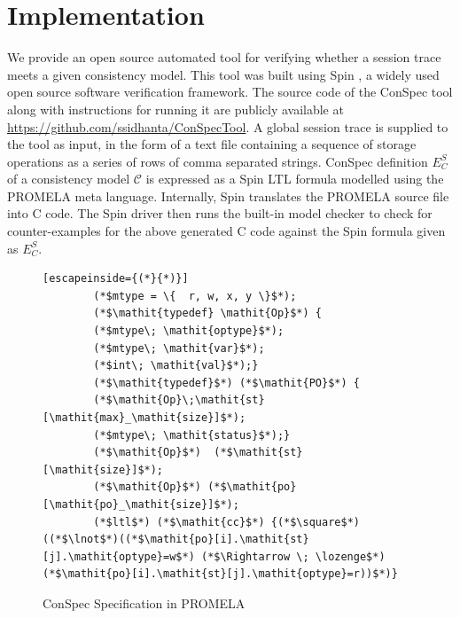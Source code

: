 \documentclass[conference]{IEEEtran}
\begin{document}
	\section{Implementation}\label{sec:impl}
	We provide an open source automated  tool for verifying whether a session trace meets a given consistency model. This tool was built using Spin \cite{Holzmann:2003:SMC:1405716}, a widely used open source software verification framework. The source code of the ConSpec tool along with instructions for running it are publicly available at \url{https://github.com/ssidhanta/ConSpecTool}.  %
	A global session trace is supplied to the tool as input, in the form of a text file containing a sequence of storage operations as a series of rows of comma separated strings.  ConSpec definition $E^S_C$ of a consistency model $\mathcal{C}$ is expressed as a Spin LTL formula modelled using the PROMELA meta language. 
	Internally, Spin translates the PROMELA source file into C code. The Spin driver then runs the built-in model checker to check for counter-examples for the above generated C code  against  the Spin formula given as $E^S_C$. %
	\begin{figure}\caption{ConSpec Specification in PROMELA}\label{format:spec}
		\begin{lstlisting}[escapeinside={(*}{*)}]
		(*$mtype = \{  r, w, x, y \}$*);
		(*$\mathit{typedef} \mathit{Op}$*) {
		(*$mtype\; \mathit{optype}$*);
		(*$mtype\; \mathit{var}$*);
		(*$int\; \mathit{val}$*);}
		(*$\mathit{typedef}$*) (*$\mathit{PO}$*) {
		(*$\mathit{Op}\;\mathit{st}[\mathit{max}_\mathit{size}]$*);
		(*$mtype\; \mathit{status}$*);}
		(*$\mathit{Op}$*)  (*$\mathit{st}[\mathit{size}]$*);
		(*$\mathit{Op}$*) (*$\mathit{po}[\mathit{po}_\mathit{size}]$*);
		(*$ltl$*) (*$\mathit{cc}$*) {(*$\square$*)((*$\lnot$*)((*$\mathit{po}[i].\mathit{st}[j].\mathit{optype}=w$*) (*$\Rightarrow \; \lozenge$*)(*$\mathit{po}[i].\mathit{st}[j].\mathit{optype}=r))$*)}
		\end{lstlisting}
	\end{figure}
\end{document}
